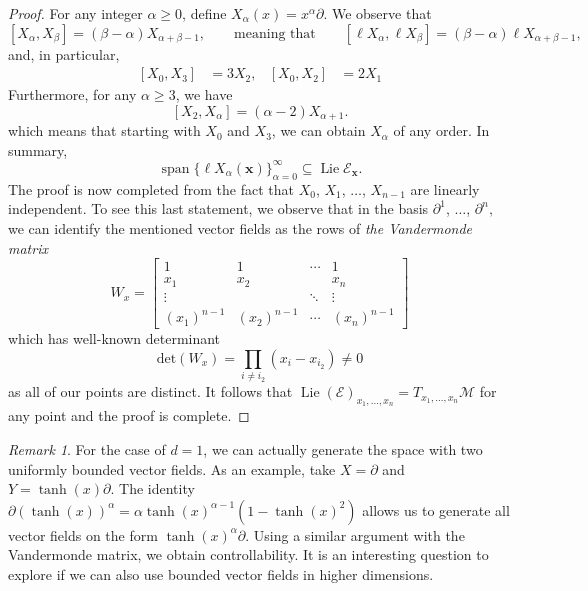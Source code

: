 \documentclass[10pt]{amsart}
\newcounter{dummy} \numberwithin{dummy}{section}
\theoremstyle{remark}
\newtheorem{remark}[dummy]{Remark}
\DeclareMathOperator{\spn}{span}
\DeclareMathOperator{\Lie}{Lie}
\newcommand{\E}{\mathcal{E}}
\newcommand{\LM}{\mathcal{M}}
\numberwithin{equation}{section}
\begin{document}
\begin{proof}
For any integer $\alpha \geq 0$, define $X_\alpha(x) = x^\alpha \partial$. We observe that
$$[X_\alpha,X_\beta] = (\beta-\alpha) X_{\alpha+\beta-1}, \qquad \text{meaning that} \qquad [\ell X_\alpha, \ell X_\beta] = (\beta-\alpha) \ell X_{\alpha+\beta-1},$$
and, in particular,
\begin{align}
{[X_0,X_3]} & = 3 X_2, & {[X_0, X_2]} & = 2X_1 
\end{align}
Furthermore, for any $\alpha \geq 3$, we have
$$[X_2, X_\alpha] = (\alpha-2) X_{\alpha+1}.$$
which means that starting with $X_0$ and $X_3$, we can obtain $X_\alpha$ of any order. In summary,
$$\spn \{ \ell X_\alpha(\mathbf{x})\}_{\alpha=0}^\infty \subseteq \Lie{\E}_{\mathbf{x}}.$$
The proof is now completed from the fact that $X_0$, $X_1$, $\dots$, $X_{n-1}$ are linearly independent. To see this last statement, we observe that in the basis $\partial^1$, $\dots$, $\partial^n,$ we can identify the mentioned vector fields as the rows of \emph{the Vandermonde matrix}
		\begin{equation} W_x =
		\begin{bmatrix}
		1 			& 1 			& \cdots 	& 1 \\
		x_1 		& x_2	 		& 			& x_n \\
		\vdots 		& 				& \ddots	& \vdots \\
		(x_1)^{n-1}		& (x_2)^{n-1}		& \cdots	& (x_n)^{n-1}
		\end{bmatrix}
		\end{equation}
		which has well-known determinant
		\begin{equation}
			\mathrm{det}(W_x) = \prod_{i \neq i_2} (x_i - x_{i_2}) \neq 0
		\end{equation}
		as all of our points are distinct. It follows that $\Lie(\E)_{x_1, \dots, x_n} = T_{x_1,\dots,x_n} \LM$ for any point and the proof is complete.
\end{proof}

\begin{remark}
For the case of $d=1$, we can actually generate the space with two uniformly bounded vector fields. As an example, take $X = \partial$ and $Y = \tanh(x) \partial$. The identity $\partial (\tanh(x))^\alpha = \alpha \tanh(x)^{\alpha-1}(1- \tanh(x)^2)$ allows us to generate all vector fields on the form $\tanh(x)^\alpha \partial$. Using a similar argument with the Vandermonde matrix, we obtain controllability. It is an interesting question to explore if we can also use bounded vector fields in higher dimensions.
\end{remark}
\end{document}
